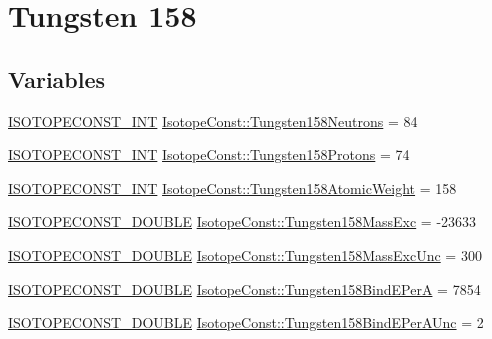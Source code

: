 \hypertarget{group___isotope_const-_tungsten-_w158}{}\section{Tungsten 158}
\label{group___isotope_const-_tungsten-_w158}
\subsection*{Variables}
\begin{DoxyCompactItemize}
\item 
\mbox{\hyperlink{group___isotope_const-_macros_ga5f18360b3e99483a35c32d789e62621c}{I\+S\+O\+T\+O\+P\+E\+C\+O\+N\+S\+T\+\_\+\+I\+NT}} \mbox{\hyperlink{group___isotope_const-_tungsten-_w158_ga72c5507e6c9d36b8096bc01bd0db118a}{Isotope\+Const\+::\+Tungsten158\+Neutrons}} = 84
\item 
\mbox{\hyperlink{group___isotope_const-_macros_ga5f18360b3e99483a35c32d789e62621c}{I\+S\+O\+T\+O\+P\+E\+C\+O\+N\+S\+T\+\_\+\+I\+NT}} \mbox{\hyperlink{group___isotope_const-_tungsten-_w158_ga86169a59eae0ecfd55a4e54fbb70f09f}{Isotope\+Const\+::\+Tungsten158\+Protons}} = 74
\item 
\mbox{\hyperlink{group___isotope_const-_macros_ga5f18360b3e99483a35c32d789e62621c}{I\+S\+O\+T\+O\+P\+E\+C\+O\+N\+S\+T\+\_\+\+I\+NT}} \mbox{\hyperlink{group___isotope_const-_tungsten-_w158_ga7d4848717bd9b6ad7d84903ed56480a3}{Isotope\+Const\+::\+Tungsten158\+Atomic\+Weight}} = 158
\item 
\mbox{\hyperlink{group___isotope_const-_macros_ga8f45a7272ce02c0b4c65c44636ed719a}{I\+S\+O\+T\+O\+P\+E\+C\+O\+N\+S\+T\+\_\+\+D\+O\+U\+B\+LE}} \mbox{\hyperlink{group___isotope_const-_tungsten-_w158_ga8c3b0c8a01931e2eb8797f2bd444411e}{Isotope\+Const\+::\+Tungsten158\+Mass\+Exc}} = -\/23633
\item 
\mbox{\hyperlink{group___isotope_const-_macros_ga8f45a7272ce02c0b4c65c44636ed719a}{I\+S\+O\+T\+O\+P\+E\+C\+O\+N\+S\+T\+\_\+\+D\+O\+U\+B\+LE}} \mbox{\hyperlink{group___isotope_const-_tungsten-_w158_gac3ce1e5b58ec08ee42e114e27e9f77be}{Isotope\+Const\+::\+Tungsten158\+Mass\+Exc\+Unc}} = 300
\item 
\mbox{\hyperlink{group___isotope_const-_macros_ga8f45a7272ce02c0b4c65c44636ed719a}{I\+S\+O\+T\+O\+P\+E\+C\+O\+N\+S\+T\+\_\+\+D\+O\+U\+B\+LE}} \mbox{\hyperlink{group___isotope_const-_tungsten-_w158_ga461a05a960eb952225d5037fe7528e61}{Isotope\+Const\+::\+Tungsten158\+Bind\+E\+PerA}} = 7854
\item 
\mbox{\hyperlink{group___isotope_const-_macros_ga8f45a7272ce02c0b4c65c44636ed719a}{I\+S\+O\+T\+O\+P\+E\+C\+O\+N\+S\+T\+\_\+\+D\+O\+U\+B\+LE}} \mbox{\hyperlink{group___isotope_const-_tungsten-_w158_ga8f2fa29fb8f75ed66f70a51122956186}{Isotope\+Const\+::\+Tungsten158\+Bind\+E\+Per\+A\+Unc}} = 2

\end{DoxyCompactItemize}
